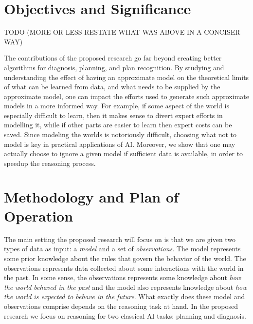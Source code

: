 \documentclass[12pt]{article}
\begin{document}
\section{Objectives and Significance}

TODO (MORE OR LESS RESTATE WHAT WAS ABOVE IN A CONCISER WAY)




The contributions of the proposed research go far beyond creating better algorithms for diagnosis, planning, and plan recognition.  By studying and understanding the effect of having an approximate model on the theoretical limits of what can be learned from data, 
and what needs to be supplied by the approximate model, one can impact the efforts used to generate such approximate models in a more informed way. For example, if some aspect of the world is especially difficult to learn, then it makes sense to divert expert efforts in modelling it, while if other parts are easier to learn then expert costs can be saved. Since modeling the worlds is notoriously difficult, choosing what not to model is key in practical applications of AI. 
Moreover, we show that one may actually choose to ignore a given model 
if sufficient data is available, in order to speedup the reasoning process. 



\section{Methodology and Plan of Operation}
\label{sec:methodology}


The main setting the proposed research will focus on is that we are given two types of data as input: 
a {\em model} and a set of {\em observations}. The model represents some prior knowledge about the rules that govern the behavior of the world. The observations represents data collected about some  interactions with the world in the past. In some sense, the observations represents some knowledge about {\em how the world behaved in the past} and the model also represents knowledge about {\em how the world is expected to behave in the future}. What exactly does these model and observations comprise depends on the reasoning task at hand. In the proposed research we focus on reasoning for two classical AI tasks: planning and diagnosis. 
\end{document}
